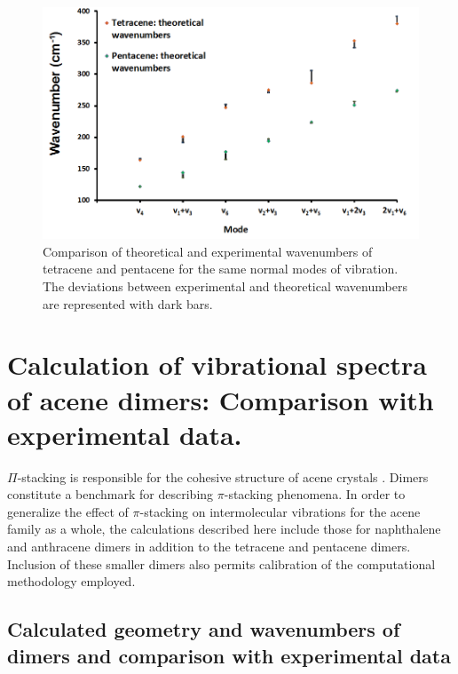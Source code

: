 \begin{figure}
	\centering
	\includegraphics[scale=0.6]{image/comparison}
	\caption[Comparison of theoretical and experimental wavenumbers of tetracene and pentacene]{Comparison of theoretical and experimental wavenumbers of tetracene and pentacene for the same normal modes of vibration. The deviations between experimental and theoretical wavenumbers are represented with dark bars.}
\end{figure}

\singlespacing
\section{Calculation of vibrational spectra of acene dimers: Comparison with experimental data.}


$\Pi$-stacking is responsible for the cohesive structure of acene crystals \cite{campbell1962crystal,mattheus2001polymorphism,brock1982temperature,facelli1993determination,brock1990temperature}. Dimers constitute a benchmark for describing $\pi$-stacking phenomena. In order to generalize the effect of $\pi$-stacking on intermolecular vibrations for the acene family as a whole, the calculations described here include those for naphthalene and anthracene dimers in addition to the tetracene and pentacene dimers. Inclusion of these smaller dimers also permits calibration of the computational methodology employed.  

\singlespacing
\subsection{Calculated geometry and wavenumbers of dimers and comparison with experimental data}


